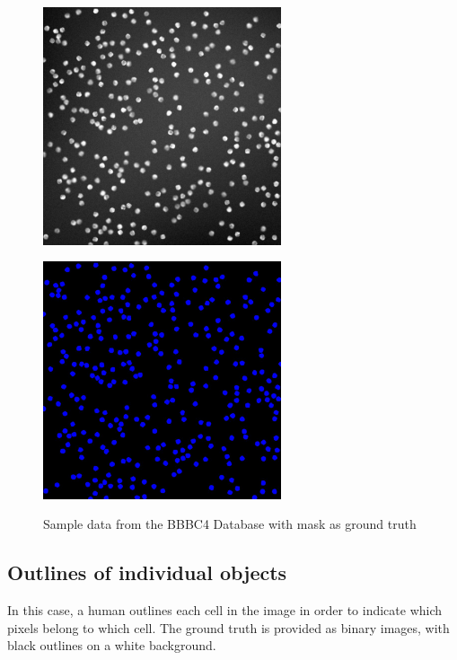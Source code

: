 \begin{figure}[H]
\begin{minipage}[c]{0.4\linewidth}
\centering
\includegraphics[width=70mm]{../images/BBBC4-1.jpg}
\label{fig:BBBC004_img}
\end{minipage}
\hfill
\begin{minipage}[c]{0.4\linewidth}
\centering
\includegraphics[width=70mm]{../images/BBBC4-1-F.jpg}
\label{fig:BBBC004_F}
\end{minipage}
\caption{Sample data from the BBBC4 Database with mask as ground truth}
\end{figure}

\subsection{Outlines of individual objects}
\hspace{\parindent}
In this case, a human outlines each cell in the image in order to indicate which pixels belong to which cell. The ground truth is provided as binary images, with black outlines on a white background.

